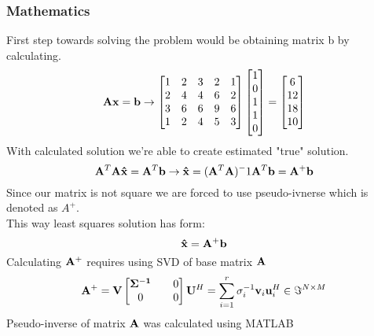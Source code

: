 \subsubsection*{Mathematics}
First step towards solving the problem would be obtaining matrix b by calculating.
\begin{equation*}
    \mathbf{A}\mathbf{x} = \mathbf{b} \rightarrow 
    \begin{bmatrix}
        1 & 2 & 3 & 2 & 1 \\
        2 & 4 & 4 & 6 & 2 \\
        3 & 6 & 6 & 9 & 6 \\
        1 & 2 & 4 & 5 & 3
    \end{bmatrix}
    \begin{bmatrix}
        1 \\
        0 \\
        1 \\
        1 \\
        0
    \end{bmatrix} =
    \begin{bmatrix}
        6 \\
        12 \\
        18 \\
        10
\end{bmatrix}
\end{equation*}
With calculated solution we're able to create estimated "true" solution.
\begin{equation*}
    \mathbf{A}^T\mathbf{A}\mathbf{\hat{x}} = \mathbf{A}^T\mathbf{b} \rightarrow
    \mathbf{\hat{x}} = (\mathbf{A}^T\mathbf{A})^-1 \mathbf{A}^T\mathbf{b} = \mathbf{A}^+\mathbf{b}
\end{equation*}
Since our matrix is not square we are forced to use pseudo-ivnerse which is denoted as $A^+$.\\
This way least squares solution has form:
\begin{equation*}
    \mathbf{\hat{x}} = \mathbf{A}^+ \mathbf{b}
\end{equation*}
Calculating $\mathbf{A^+}$ requires using SVD of base matrix $\mathbf{\mathbf{A}}$
\begin{equation*}
    \mathbf{A^+} = \mathbf{V} 
    \begin{bmatrix}
        \mathbf{\Sigma^{-1}} && 0 \\
        0 && 0
    \end{bmatrix}
    \mathbf{U}^H = \sum_{i=1}^{r} \sigma_i^{-1} \mathbf{v}_i\mathbf{u}_i^H \in \mathbf{\Im}^{N \times M} 
\end{equation*}
Pseudo-inverse of matrix $\mathbf{A}$ was calculated using MATLAB

